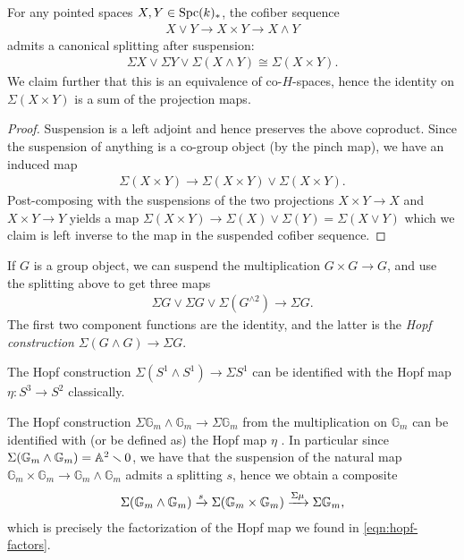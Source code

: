 \documentclass[11pt,openany]{book}
\let\smashprod\wedge
\begin{document}
\begin{proposition} 
For any pointed spaces $X,Y \in \mathrm{Spc}(k)_\ast$, the cofiber sequence
\begin{align*}
    X \vee Y \to X \times Y \to X \smashprod Y
\end{align*}
admits a canonical splitting after suspension:
\begin{align*}
    \Sigma X \vee \Sigma Y \vee \Sigma(X \smashprod Y) \cong \Sigma(X \times Y).
\end{align*}
We claim further that this is an equivalence of co-$H$-spaces, hence the identity on $\Sigma (X \times Y)$ is a sum of the projection maps.
\end{proposition}
\begin{proof} Suspension is a left adjoint and hence preserves the above coproduct. Since the suspension of anything is a co-group object (by the pinch map), we have an induced map
\begin{align*}
    \Sigma(X \times Y) \to \Sigma(X \times Y) \vee \Sigma (X \times Y).
\end{align*}
Post-composing with the suspensions of the two projections $X \times Y \to X$ and $X \times Y \to Y$ yields a map $\Sigma (X \times Y) \to \Sigma(X) \vee \Sigma(Y) = \Sigma(X \vee Y)$ which we claim is left inverse to the map in the suspended cofiber sequence.
\end{proof}

\begin{corollary} If $G$ is a group object, we can suspend the multiplication $G \times G \to G$, and use the splitting above to get three maps
\begin{align*}
    \Sigma G \vee \Sigma G \vee \Sigma (G^{\smashprod 2}) \to \Sigma G.
\end{align*}
The first two component functions are the identity, and the latter is the \textit{Hopf construction} $\Sigma (G \smashprod G) \to \Sigma G$.
\end{corollary}

\begin{example} The Hopf construction $\Sigma (S^1 \smashprod  S^1) \to \Sigma S^1$ can be identified with the Hopf map $\eta \colon S^3 \to S^2$ classically.
\end{example}

\begin{proposition} The Hopf construction $\Sigma \mathbb{G}_m \smashprod \mathbb{G}_m \to \Sigma\mathbb{G}_m$ from the multiplication on $\mathbb{G}_m$ can be identified with (or be defined as) the Hopf map $\eta$ \cite[p.~71]{Morel}. In particular since $\Sigma( \mathbb{G}_m \smashprod \mathbb{G}_m) = \A^2\minus 0$, we have that the suspension of the natural map $\mathbb{G}_m \times \mathbb{G}_m \to \mathbb{G}_m \smashprod  \mathbb{G}_m$ admits a splitting $s$, hence we obtain a composite
\begin{align*}
    \Sigma (\mathbb{G}_m \smashprod \mathbb{G}_m) \xto{s} \Sigma (\mathbb{G}_m \times \mathbb{G}_m) \xto{\Sigma \mu} \Sigma \mathbb{G}_m,
\end{align*}
which is precisely the factorization of the Hopf map we found in \autoref{eqn:hopf-factors}.
\end{proposition}
\end{document}
